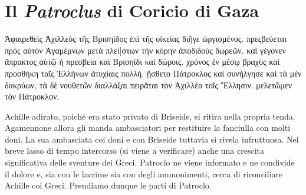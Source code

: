 \documentclass[11pt,a4paper]{book}
\begin{document}
\part{Il \emph{Patroclus} di Coricio di Gaza}

\begin{pages}
\begin{Leftside}
\beginnumbering
\pstart{}
\pend

\pstart
{}
\pend

\pstart
Ἀφαιρεθεὶς Ἀχιλλεὺς τῆς Βρισηίδος ἐπὶ τῆς οἰκείας διῆγε  ὠργισμένος. πρεςβεύεται πρὸς αὐτὸν Ἀγαμέμνων μετὰ πλεί|στων τὴν κόρην ἀποδιδοὺς δωρεῶν. καὶ γέγονεν ἄπρακτος αὐτῷ ἡ πρεσβεία καὶ Βρισηίδι καὶ δώροις. χρόνος ἐν μέσῳ βραχὺς καὶ προσθήκη ταῖς Ἑλλήνων ἀτυχίαις πολλή. ᾔσθετο Πάτροκλος καὶ συνήλγησε καὶ τὰ μὲν δακρύων, τὰ δὲ νουθετῶν διαλλάξαι πειρᾶται τὸν Ἀχιλλέα τοῖς Ἕλλησιν. μελετῶμεν τὸν Πάτροκλον.
\pend

\endnumbering
\end{Leftside}

\begin{Rightside}
\beginnumbering
\numberpstartfalse

\pstart
{}
\pend

\pstart
{}
\pend

\pstart
Achille adirato, poiché era stato privato di Briseide, si ritira nella propria tenda. Agamennone allora gli manda ambasciatori per restituire la fanciulla con molti doni. La sua ambasciata coi doni e con Briseide tuttavia si rivela infruttuosa. Nel breve lasso di tempo intercorso (si viene a verificare) anche una crescita significativa delle sventure dei Greci. Patroclo ne viene informato e ne condivide il dolore e, sia con le lacrime sia con degli ammonimenti, cerca di riconciliare Achille coi Greci. Prendiamo dunque le parti di Patroclo.
\pend

\endnumbering
\end{Rightside}
\end{pages}
\Pages
\end{document}
